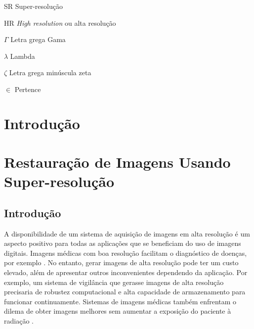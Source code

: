 \documentclass[12pt,openright,oneside,a4paper,english,brazil]{abntex2}
\begin{document}
\begin{siglas}
	\item[SR] Super-resolução
	\item[HR] \textit{High resolution} ou alta resolução
\end{siglas}

\begin{simbolos}
	\item[$ \Gamma $] Letra grega Gama
	\item[$ \lambda $] Lambda
	\item[$ \zeta $] Letra grega minúscula zeta
	\item[$ \in $] Pertence
\end{simbolos}

\tableofcontents*
\cleardoublepage



\textual

\chapter[Introdução]{Introdução}

\chapter{Restauração de Imagens Usando Super-resolução}
\section{Introdução}
A disponibilidade de um sistema de aquisição de imagens em alta resolução é um aspecto positivo para todas as aplicações que se beneficiam do uso de imagens digitais.
Imagens médicas com boa resolução facilitam o diagnóstico de doenças, por exemplo \cite{park2003super}.
No entanto, gerar imagens de alta resolução pode ter um custo elevado, além de apresentar outros inconvenientes dependendo da aplicação.
Por exemplo, um sistema de vigilância que gerasse imagens de alta resolução precisaria de robustez computacional e alta capacidade de armazenamento para funcionar continuamente.
Sistemas de imagens médicas também enfrentam o dilema de obter imagens melhores sem aumentar a exposição do paciente à radiação \cite{yue2016image}.
\end{document}
